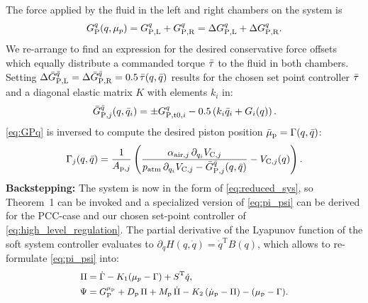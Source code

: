 The force applied by the fluid in the left and right chambers on the system is
\begin{equation}\small
    G_{\mathrm{P}}^q(q, \mu_p) =  G_{\mathrm{P},\mathrm{L}}^q + G_{\mathrm{P},\mathrm{R}}^q = \Delta G_{\mathrm{P},\mathrm{L}}^q + \Delta G_{\mathrm{P},\mathrm{R}}^q .
\end{equation}
We re-arrange to find an expression for the desired conservative force offsets which equally distribute a commanded torque $\Bar{\tau}$ to the fluid in both chambers. Setting
$\Delta \Bar{G}_{\mathrm{P},\mathrm{L}}^{\Bar{q}} =  \Delta \Bar{G}_{\mathrm{P},\mathrm{R}}^{\Bar{q}} = 0.5 \, \Bar{\tau}(q, \Bar{q})$
results for the chosen set point controller $\Bar{\tau}$ and a diagonal elastic matrix $K$ with elements $k_i$ in:
\begin{equation}\small\label{eq:dist_G_p_q_planar_pcc}
    \Bar{G}_{\mathrm{P},j}^{\Bar{q}}(q, \Bar{q}_i) 
    = \pm G_{\mathrm{P},\mathrm{t}0,i}^{q} - 0.5 \left ( k_i \Bar{q}_i + G_i(q) \right ).
\end{equation}
\eqref{eq:GPq} is inversed to compute the desired piston position $\Bar{\mu}_{\mathrm{p}} = \Gamma(q, \Bar{q})$:
\begin{equation}\small\label{eq:gamma}
    \Gamma_j(q, \Bar{q}) = \frac{1}{A_{\mathrm{p},j}} \left ( \frac{\alpha_{\mathrm{air},j} \, \partial_{q_i} V_{\mathrm{C},j}}{p_\mathrm{atm} \, \partial_{q_i} V_{\mathrm{C},j} - \Bar{G}_{\mathrm{P},j}^{\Bar{q}}(q, \Bar{q})} - V_{\mathrm{C},j}(q) \right ).
\end{equation}
\textbf{Backstepping:}
The system is now in the form of \eqref{eq:reduced_sys}, so Theorem~1 can be invoked and a specialized version of \eqref{eq:pi_psi} can be derived for the \gls{PCC}-case and our chosen set-point controller of \eqref{eq:high_level_regulation}. The partial derivative of the Lyapunov function of the soft system controller evaluates to $ \partial_{\dot{q}} H(q, \dot{q}) = \dot{q}^\mathrm{T} B(q)$, which allows to re-formulate \eqref{eq:pi_psi} into:
\begin{equation}\small
\begin{split}
    \Pi &= \dot{\Gamma} - K_1 (\mu_p - \Gamma) + S^\mathrm{T} \dot{q},\\
    \Psi &= G_{\mathrm{P}}^{\mu_\mathrm{p}} + D_\mathrm{p} \, \Pi + M_\mathrm{p} \, \dot{\Pi} - K_2 \, (\dot{\mu}_\mathrm{p} - \Pi) - (\mu_\mathrm{p} - \Gamma).
\end{split}
\end{equation}

